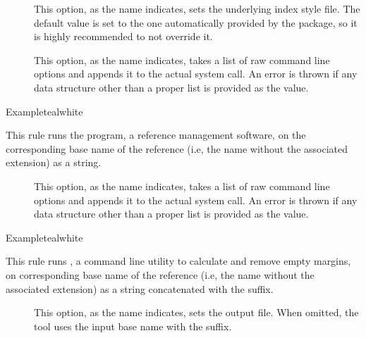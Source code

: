 \begin{description}
\begin{description}
\item[] This option, as the name indicates, sets the underlying index style file. The default value is set to the one automatically provided by the  package, so it is highly recommended to not override it.

\item[] This option, as the name indicates, takes a list of raw command line options and appends it to the actual system call. An error is thrown if any data structure other than a proper list is provided as the value.
\end{description}

\begin{codebox}{Example}{teal}{\icnote}{white}
\end{codebox}

\item[\rulebox{pbibtex}]
This rule runs the  program, a reference management software, on the corresponding base name of the  reference (i.e, the name without the associated extension) as a string.

\begin{description}
\item[] This option, as the name indicates, takes a list of raw command line options and appends it to the actual system call. An error is thrown if any data structure other than a proper list is provided as the value.
\end{description}

\begin{codebox}{Example}{teal}{\icnote}{white}
\end{codebox}

\item[\rulebox{pdfcrop}]
This rule runs , a command line utility to calculate and remove empty margins, on corresponding base name of the  reference (i.e, the name without the associated extension) as a string concatenated with the  suffix.

\begin{description}
\item[] This option, as the name indicates, sets the output file. When omitted, the tool uses the input base name with the  suffix.


\end{description}
\end{description}
